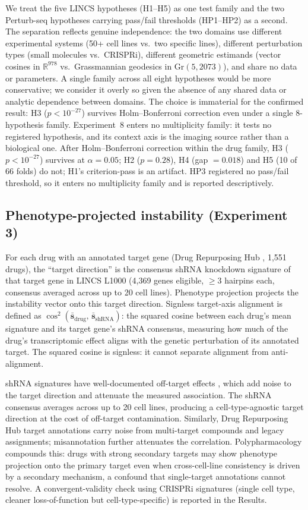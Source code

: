 \documentclass[11pt]{article}
\begin{document}
We treat the five LINCS hypotheses (H1--H5) as one test family and the two
Perturb-seq hypotheses carrying pass/fail thresholds (HP1--HP2) as a second. The separation
reflects genuine independence: the two domains use different experimental
systems (50+ cell lines vs.\ two specific lines), different perturbation types
(small molecules vs.\ CRISPRi), different geometric estimands (vector
cosines in $\mathbb{R}^{978}$ vs.\ Grassmannian geodesics in Gr$(5, 2073)$),
and share no data or parameters. A single family across all eight hypotheses
would be more conservative; we consider it overly so given the absence of
any shared data or analytic dependence between domains. The choice is
immaterial for the confirmed result: H3 ($p < 10^{-27}$) survives
Holm--Bonferroni correction even under a single 8-hypothesis family. Experiment~8
enters no multiplicity family: it tests no registered hypothesis, and its
context axis is the imaging source rather than a biological one. After Holm--Bonferroni
correction within the drug family, H3 ($p < 10^{-27}$) survives at
$\alpha = 0.05$; H2 ($p = 0.28$), H4 (gap $= 0.018$) and H5 (10 of 66
folds) do not;
H1's criterion-pass is an artifact.
HP3 registered no pass/fail threshold, so it enters no multiplicity
family and is reported descriptively.

\subsection{Phenotype-projected instability (Experiment 3)}

For each drug with an annotated target gene (Drug Repurposing Hub
\citep{corsello2017drug}, 1{,}551 drugs), the ``target direction'' is the consensus shRNA
knockdown signature of that target gene in LINCS L1000 (4{,}369 genes
eligible, $\geq$3 hairpins each, consensus averaged across up to 20 cell lines).
Phenotype projection projects the instability vector onto this
target direction. Signless target-axis alignment is defined as $\cos^2(\bar{\mathbf{s}}_{\text{drug}},\,
\bar{\mathbf{s}}_{\text{shRNA}})$: the squared cosine between each drug's
mean signature and its target gene's shRNA consensus, measuring how much
of the drug's transcriptomic effect aligns with the genetic perturbation of
its annotated target. The squared cosine is signless: it cannot separate
alignment from anti-alignment.

shRNA signatures have well-documented off-target effects
\citep{smith2017evaluation}, which add noise to the target direction and
attenuate the measured association.
The shRNA consensus averages across up to 20 cell lines, producing a
cell-type-agnostic target direction at the cost of off-target
contamination. Similarly, Drug Repurposing Hub target annotations carry
noise from multi-target compounds and legacy assignments; misannotation
further attenuates the correlation. Polypharmacology compounds this:
drugs with strong secondary targets may show phenotype projection onto the
primary target even when cross-cell-line consistency is driven by a
secondary mechanism, a confound that single-target annotations cannot
resolve. A convergent-validity
check using CRISPRi signatures (single cell type, cleaner
loss-of-function but cell-type-specific) is reported in the Results.
\end{document}
